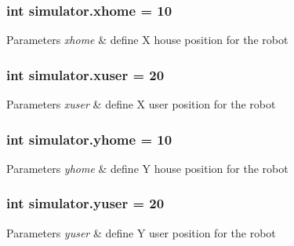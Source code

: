 \subsubsection[{\texorpdfstring{xhome}{xhome}}]{\setlength{\rightskip}{0pt plus 5cm}int simulator.\+xhome = 10}\hypertarget{namespacesimulator_a7cb44b4fde9abc70f6a195d10c51bbba}{}\label{namespacesimulator_a7cb44b4fde9abc70f6a195d10c51bbba}

\begin{DoxyParams}{Parameters}
{\em xhome} & define X house position for the robot \\
\hline
\end{DoxyParams}
\subsubsection[{\texorpdfstring{xuser}{xuser}}]{\setlength{\rightskip}{0pt plus 5cm}int simulator.\+xuser = 20}\hypertarget{namespacesimulator_a3d1c7457316ccd47743a65f987ff0f20}{}\label{namespacesimulator_a3d1c7457316ccd47743a65f987ff0f20}

\begin{DoxyParams}{Parameters}
{\em xuser} & define X user position for the robot \\
\hline
\end{DoxyParams}
\subsubsection[{\texorpdfstring{yhome}{yhome}}]{\setlength{\rightskip}{0pt plus 5cm}int simulator.\+yhome = 10}\hypertarget{namespacesimulator_a66405888f72898110da958086559a9a2}{}\label{namespacesimulator_a66405888f72898110da958086559a9a2}

\begin{DoxyParams}{Parameters}
{\em yhome} & define Y house position for the robot \\
\hline
\end{DoxyParams}
\subsubsection[{\texorpdfstring{yuser}{yuser}}]{\setlength{\rightskip}{0pt plus 5cm}int simulator.\+yuser = 20}\hypertarget{namespacesimulator_aab63d65afcbd7479db9aefecf1371783}{}\label{namespacesimulator_aab63d65afcbd7479db9aefecf1371783}

\begin{DoxyParams}{Parameters}
{\em yuser} & define Y user position for the robot \\
\hline
\end{DoxyParams}
